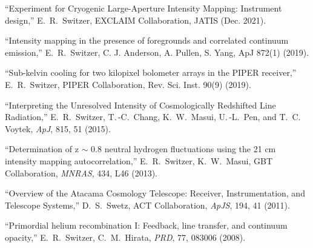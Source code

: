 \item ``Experiment for Cryogenic Large-Aperture Intensity Mapping: Instrument design,'' E.\ R.\ Switzer, EXCLAIM Collaboration, JATIS (Dec. 2021).
\item ``Intensity mapping in the presence of foregrounds and correlated continuum emission,'' E.\, R.\, Switzer, C. J. Anderson, A. Pullen, S. Yang, ApJ 872(1) (2019).
\item ``Sub-kelvin cooling for two kilopixel bolometer arrays in the PIPER receiver,'' E.\ R.\ Switzer, PIPER Collaboration, Rev. Sci. Inst. 90(9) (2019).
\item ``Interpreting the Unresolved Intensity of Cosmologically Redshifted Line Radiation,'' E.\, R.\, Switzer, T.\,-C.\, Chang, K.\, W.\, Masui, U.\,-L.\, Pen, and T.\, C.\, Voytek, {\it ApJ}, 815, 51 (2015).
\item ``Determination of z $\sim$ 0.8 neutral hydrogen fluctuations using the 21 cm intensity mapping autocorrelation,'' E.\, R.\, Switzer, K.\, W.\, Masui, GBT Collaboration, {\it MNRAS}, 434, L46 (2013).
\item ``Overview of the Atacama Cosmology Telescope: Receiver, Instrumentation, and Telescope Systems,'' D.\, S.\, Swetz, ACT Collaboration, {\it ApJS}, 194, 41 (2011).
\item ``Primordial helium recombination I: Feedback, line transfer, and continuum opacity,'' E.\, R.\, Switzer, C.\, M.\, Hirata, {\it PRD}, 77, 083006 (2008).
